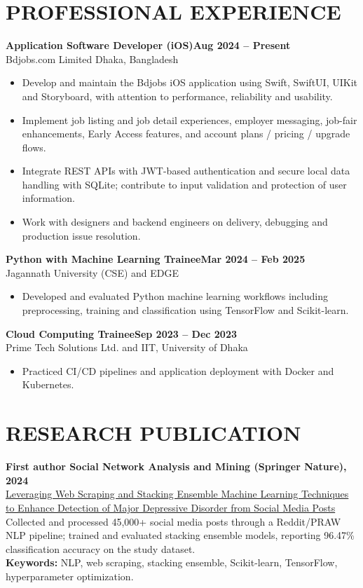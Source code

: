 \documentclass[a4paper,10pt]{article}
\newcommand{\metatxt}[1]{{\small\color{textgray}#1}}
\newcommand{\position}[3]{\textbf{\color{navy}#1}\hfill{\small\color{green}\textbf{#3}}\\[-2pt]\metatxt{#2}\\[-1pt]}
\begin{document}
\section{PROFESSIONAL EXPERIENCE}
\position{Application Software Developer (iOS)}{Bdjobs.com Limited \textbar{} Dhaka, Bangladesh}{Aug 2024 -- Present}
\begin{itemize}
\item Develop and maintain the Bdjobs iOS application using Swift, SwiftUI, UIKit and Storyboard, with attention to performance, reliability and usability.
\item Implement job listing and job detail experiences, employer messaging, job-fair enhancements, Early Access features, and account plans / pricing / upgrade flows.
\item Integrate REST APIs with JWT-based authentication and secure local data handling with SQLite; contribute to input validation and protection of user information.
\item Work with designers and backend engineers on delivery, debugging and production issue resolution.
\end{itemize}
\vspace{3pt}
\position{Python with Machine Learning Trainee}{Jagannath University (CSE) and EDGE}{Mar 2024 -- Feb 2025}
\begin{itemize}
\item Developed and evaluated Python machine learning workflows including preprocessing, training and classification using TensorFlow and Scikit-learn.
\end{itemize}
\vspace{1pt}
\position{Cloud Computing Trainee}{Prime Tech Solutions Ltd. and IIT, University of Dhaka}{Sep 2023 -- Dec 2023}
\begin{itemize}
\item Practiced CI/CD pipelines and application deployment with Docker and Kubernetes.
\end{itemize}

\section{RESEARCH PUBLICATION}
\textbf{\color{navy}First author \textbar{} Social Network Analysis and Mining (Springer Nature), 2024}\\
{\small \href{https://doi.org/10.1007/s13278-024-01392-w}{Leveraging Web Scraping and Stacking Ensemble Machine Learning Techniques to Enhance Detection of Major Depressive Disorder from Social Media Posts}}\\[-1pt]
Collected and processed 45,000+ social media posts through a Reddit/PRAW NLP pipeline; trained and evaluated stacking ensemble models, reporting 96.47\% classification accuracy on the study dataset.\\[-1pt]
\textbf{Keywords:} NLP, web scraping, stacking ensemble, Scikit-learn, TensorFlow, hyperparameter optimization.
\end{document}
